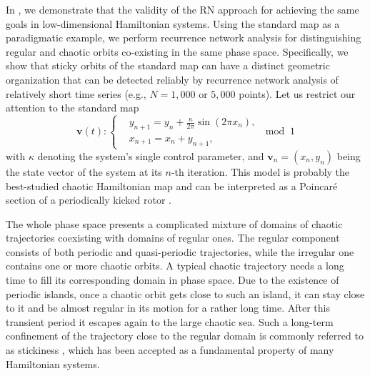 		In \cite{Zou2016d}, we demonstrate that the validity of the RN approach for achieving the same goals in low-dimensional Hamiltonian systems. Using the standard map as a paradigmatic example, we perform recurrence network analysis for distinguishing regular and chaotic orbits co-existing in the same phase space. Specifically, we show that sticky orbits of the standard map can have a distinct geometric organization that can be detected reliably by recurrence network analysis of relatively short time series (e.g., $N=1,000$ or $5,000$ points). Let us restrict our attention to the standard map
\begin{equation} \label{std_map_book}
\mathbf{v}(t): \left \{ \begin{aligned}
& y_{n+1} = y_{n} + \frac{\kappa}{2 \pi}\sin(2 \pi x_{n}),  \\
& x_{n+1} = x_{n} + y_{n+1},
\end{aligned} \;\;\text{mod}\;\; 1
\right.
\end{equation}
with $\kappa $ denoting the system's single control parameter, and $\mathbf{v}_n=(x_n,y_n)$ being the state vector of the system at its $n$-th iteration. This model is probably the best-studied chaotic Hamiltonian map and can be interpreted as a Poincar\'e section of a periodically kicked rotor \cite{Lichtenberg_Lieberman_regular,Meiss_rmp_1992}.
		
		The whole phase space presents a complicated mixture of domains of chaotic trajectories coexisting with domains of regular ones. The regular component consists of both periodic and quasi-periodic trajectories, while the irregular one contains one or more chaotic orbits. A typical chaotic trajectory needs a long time to fill its corresponding domain in phase space. Due to the existence of periodic islands, once a chaotic orbit gets close to such an island, it can stay close to it and be almost regular in its motion for a rather long time. After this transient period it escapes again to the large chaotic sea. Such a long-term confinement of the trajectory close to the regular domain is commonly referred to as stickiness \cite{Karney_physicaD_1983,Meiss_rmp_1992}, which has been accepted as a fundamental property of many Hamiltonian systems. 
		
